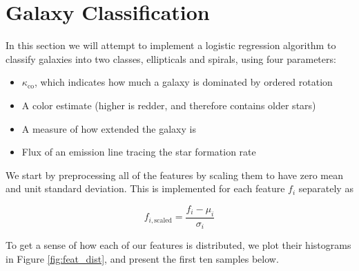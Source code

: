 \section{Galaxy Classification}


In this section we will attempt to implement a logistic regression algorithm to classify galaxies into two classes, ellipticals and spirals, using four parameters:

\begin{itemize}
    \item $\kappa_{\mathrm{co}}$, which indicates how much a galaxy is dominated by ordered rotation
    \item A color estimate (higher is redder, and therefore contains older stars)
    \item A measure of how extended the galaxy is
    \item Flux of an emission line tracing the star formation rate
\end{itemize}

We start by preprocessing all of the features by scaling them to have zero mean and unit standard deviation. This is implemented for each feature $f_i$ separately as

\begin{equation}
    f_{i, \mathrm{scaled}} = \frac{f_i - \mu_i}{\sigma_i}
\end{equation}

To get a sense of how each of our features is distributed, we plot their histograms in Figure \ref{fig:feat_dist}, and present the first ten samples below.





